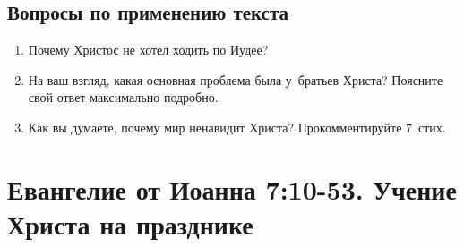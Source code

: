 \documentclass[a4paper,12pt]{article}
\begin{document}
\subsection*{Вопросы по применению текста} 
\begin{enumerate}
    \item Почему Христос не хотел ходить по Иудее? 
    
    \myline
    
    \myline
    \item На ваш взгляд, какая основная проблема была у~братьев Христа? Поясните свой ответ максимально подробно. 
    
    \myline
    
    \myline
    \item Как вы думаете, почему мир ненавидит Христа? Прокомментируйте 7~стих. 
    
    \myline
    
    \myline
\end{enumerate}



\section{Евангелие от Иоанна 7:10-53. Учение Христа на празднике}
\end{document}
